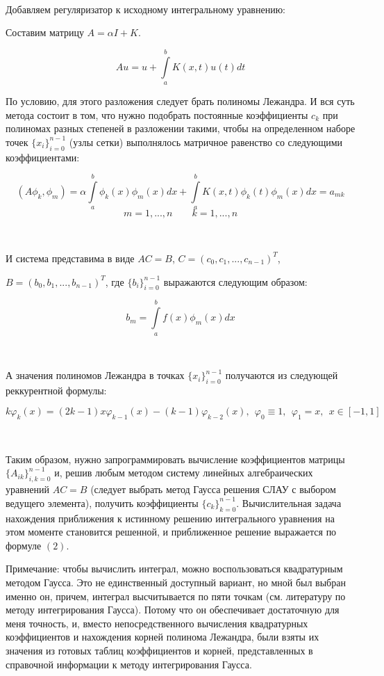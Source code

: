\documentclass[12pt,a4paper]{article}
\begin{document}
\

Добавляем регуляризатор к исходному интегральному уравнению:

Составим матрицу $A = \alpha I + K$.

$$Au = u +\int\limits_a^b K(x,t)u(t)dt$$

По условию, для этого разложения следует брать полиномы Лежандра. И вся суть метода состоит в том, что нужно подобрать постоянные коэффициенты $c_k$ при полиномах разных степеней в разложении такими, чтобы на определенном наборе точек $\{ x_i \}_{i=0}^{n-1}$ (узлы сетки) выполнялось матричное равенство со следующими коэффициентами:

$$(A\phi_k, \phi_m) = \alpha \int\limits_a^b \phi_k(x)\phi_m(x)dx + \int\limits_a^b K(x,t) \phi_k(t) \phi_m(x)dx = a_{mk}$$
$$ m = 1, ..., n \qquad k = 1, ... , n $$

\

И система представима в виде $ AC = B $, 
$ C = \left ( c_0, c_1, ..., c_{n-1} \right )^T$, 

$ B = \left ( b_0, b_1, ..., b_{n-1} \right )^T $, 
где $\{ b_i \}_{i=0}^{n-1}$ выражаются следующим образом:

$$b_m = \int\limits_a^b f(x)\phi_m(x)dx$$ 

\

А значения полиномов Лежандра в точках $\{ x_i \}_{i=0}^{n-1}$ получаются из следующей реккурентной формулы:

\begin{equation}
 k\varphi_k(x) = (2k-1)x \varphi_{k-1}(x) - (k-1) \varphi_{k-2}(x), \ \ 
 \varphi_0 \equiv 1, \ \ \varphi_1 = x, \ \ x \in [-1,1]
\end{equation}

\

Таким образом, нужно запрограммировать вычисление коэффициентов матрицы $\{ A_{ik} \}_{i,k=0}^{n-1}$ и, решив любым методом систему линейных алгебраических уравнений $ AC = B $ (следует выбрать метод Гаусса решения СЛАУ с выбором ведущего элемента), получить коэффициенты $\{ c_k \}_{k=0}^{n-1}$. Вычислительная задача нахождения приближения к истинному решению интегрального уравнения на этом моменте становится решенной, и приближенное решение выражается по формуле $(2)$.

Примечание: чтобы вычислить интеграл, можно воспользоваться квадратурным методом Гаусса. Это не единственный доступный вариант, но мной был выбран именно он, причем, интеграл высчитывается по пяти точкам (см. литературу по методу интегрирования Гаусса). Потому что он обеспечивает достаточную для меня точность, и, вместо непосредственного вычисления квадратурных коэффициентов и нахождения корней полинома Лежандра, были взяты их значения из готовых таблиц коэффициентов и корней, представленных в справочной информации к методу интегрирования Гаусса.
\end{document}
